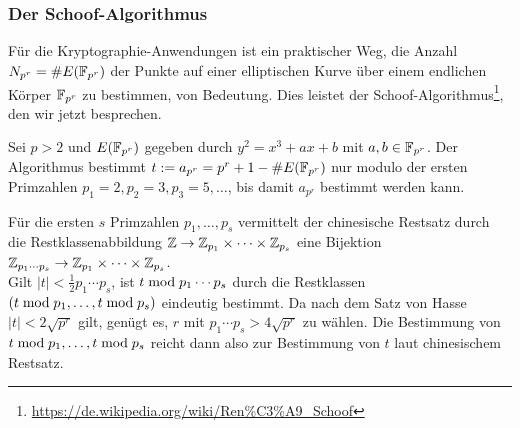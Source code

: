 \subsubsection{Der Schoof-Algorithmus}
\label{subsub:3.3.3}
\begin{bem}
	Für die Kryptographie-Anwendungen ist ein praktischer Weg, die Anzahl $N_{p^r} = \#E(\mathbb{F}_{p^r})$ der Punkte auf einer elliptischen Kurve über einem endlichen Körper $\mathbb{F}_{p^r}$ zu bestimmen, von Bedeutung.
	Dies leistet der Schoof-Algorithmus\footnote{\url{https://de.wikipedia.org/wiki/Ren\%C3\%A9_Schoof}}, den wir jetzt besprechen.
\end{bem}

\begin{anw}
	Sei $p > 2$ und $E(\mathbb{F}_{p^r})$ gegeben durch $y^2 = x^3 + ax + b$ mit $a,b \in \mathbb{F}_{p^r}$.
	Der Algorithmus bestimmt $t := a_{p^r} = p^r + 1 - \#E(\mathbb{F}_{p^r})$ nur modulo der ersten Primzahlen $p_1 = 2, p_2 = 3, p_3 = 5, \dots$, bis damit $a_{p^r}$ bestimmt werden kann.
\end{anw}

\begin{bem}
	Für die ersten $s$ Primzahlen $p_1,\dots,p_s$ vermittelt der chinesische Restsatz durch die Restklassenabbildung $\mathbb{Z} \rightarrow \mathbb{Z}_{p_1} \times \dots \times \mathbb{Z}_{p_s}$ eine Bijektion $\mathbb{Z}_{p_1 \cdots p_s} \rightarrow \mathbb{Z}_{p_1} \times \dots \times \mathbb{Z}_{p_s}$. \\
	Gilt $|t| < \frac{1}{2} p_1 \cdots p_s$, ist $t \bmod p_1 \cdots p_s$ durch die Restklassen $(t \bmod p_1, \dots, t \bmod p_s)$ eindeutig bestimmt.
	Da nach dem Satz von Hasse $|t| < 2 \sqrt{p^r}$ gilt, genügt es, $r$ mit $p_1 \cdots p_s > 4 \sqrt{p^r}$ zu wählen.
	Die Bestimmung von $t \bmod p_1, \dots, t \bmod p_s$ reicht dann also zur Bestimmung von $t$ laut chinesischem Restsatz.
\end{bem}

